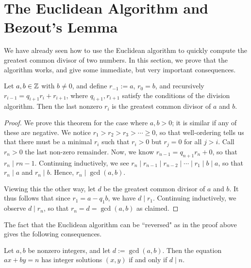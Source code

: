 \documentclass{article}
\begin{document}
\setcounter{section}{27}
\section{The Euclidean Algorithm and Bezout's Lemma}
We have already seen how to use the Euclidean algorithm to quickly compute the greatest common divisor of two numbers. In this section, we prove that the algorithm works, and give some immediate, but very important consequences.
\begin{theorem}
Let $a,b\in \mathbb Z$ with $b \neq 0$, and define $r_{-1} := a$, $r_0 = b$, and recursively $r_{i-1} = q_{i+1}r_i + r_{i+1}$, where $q_{i+1}, r_{i+1}$ satisfy the conditions of the division algorithm. Then the last nonzero $r_i$ is the greatest common divisor of $a$ and $b$.
\end{theorem}
\begin{proof}
We prove this theorem for the case where $a,b > 0$; it is similar if any of these are negative. We notice $r_1 > r_2 > r_3 > \cdots \geq 0$, so that well-ordering tells us that there must be a minimal $r_i$ such that $r_i > 0$ but $r_j = 0$ for all $j > i$. Call $r_{n} > 0$ the last non-zero remainder. Now, we know $r_{n-1} = q_{n+1}r_n + 0$, so that $r_n \mid r{n-1}$. Continuing inductively, we see $r_n\mid r_{n-1}\mid r_{n-2}\mid \cdots \mid r_1 \mid b \mid a$, so that $r_n\mid a$ and $r_n\mid b$. Hence, $r_n \mid \gcd(a, b)$.

Viewing this the other way, let $d$ be the greatest common divisor of $a$ and $b$. It thus follows that since $r_1 = a - q_1b$, we have $d\mid r_1$. Continuing inductively, we observe $d\mid r_n$, so that $r_n = d = \gcd(a,b)$ as claimed.
\end{proof}

The fact that the Euclidean algorithm can be ``reversed" as in the proof above gives the following consequences.
\begin{corollary}
Let $a,b$ be nonzero integers, and let $d := \gcd(a,b)$. Then the equation $ax + by = n$ has integer solutions $(x,y)$ if and only if $d\mid n$.
\end{corollary}
\end{document}
